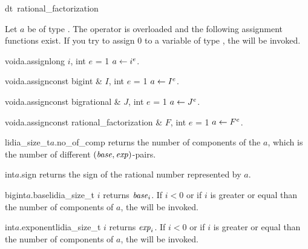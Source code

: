 \begin{fcode}{dt}{~rational_factorization}{}
\end{fcode}



\ASGN

Let $a$ be of type .  The operator \code{=} is overloaded and the
following assignment functions exist.  If you try to assign $0$ to a variable of type
, the \LEH will be invoked.

\begin{fcode}{void}{a.assign}{long $i$, int $e$ = 1}
  $a \leftarrow i^e$.
\end{fcode}

\begin{fcode}{void}{a.assign}{const bigint & $I$, int $e$ = 1}
  $a \leftarrow I^e$.
\end{fcode}

\begin{fcode}{void}{a.assign}{const bigrational & $J$, int $e$ = 1}
  $a \leftarrow J^e$.
\end{fcode}

\begin{fcode}{void}{a.assign}{const rational_factorization & $F$, int $e$ = 1}
  $a \leftarrow F^e$.
\end{fcode}



\ACCS

\begin{cfcode}{lidia_size_t}{$a$.no_of_comp}{}
  returns the number of components of the  $a$, which is the number
  of different $(\mathit{base}, \mathit{exp})$-pairs.
\end{cfcode}

\begin{cfcode}{int}{$a$.sign}{}
  returns the sign of the rational number represented by $a$.
\end{cfcode}


\begin{cfcode}{bigint}{$a$.base}{lidia_size_t $i$}
  returns $\mathit{base}_i$.  If $i < 0$ or if $i$ is greater or equal than the number of components of
  $a$, the \LEH will be invoked.
\end{cfcode}


\begin{cfcode}{int}{$a$.exponent}{lidia_size_t $i$}
  returns $\mathit{exp}_i$.  If $i < 0$ or if $i$ is greater or equal than the number of components of
  $a$, the \LEH will be invoked.
\end{cfcode}

